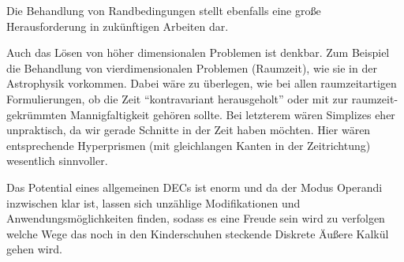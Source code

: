 Die Behandlung von Randbedingungen stellt ebenfalls eine große Herausforderung in zukünftigen Arbeiten dar.

Auch das Lösen von höher dimensionalen Problemen ist denkbar.
Zum Beispiel die Behandlung von vierdimensionalen Problemen (Raumzeit), wie sie in der Astrophysik vorkommen.
Dabei wäre zu überlegen, wie bei allen raumzeitartigen Formulierungen, ob die Zeit "`kontravariant herausgeholt"' 
oder mit zur raumzeit-gekrümmten Mannigfaltigkeit gehören sollte. 
Bei letzterem wären Simplizes eher unpraktisch, da wir gerade Schnitte in der Zeit haben möchten. 
Hier wären entsprechende Hyperprismen (mit gleichlangen Kanten in der Zeitrichtung) wesentlich sinnvoller.

Das Potential eines allgemeinen DECs ist enorm und da der Modus Operandi inzwischen klar ist, lassen sich unzählige Modifikationen und
Anwendungsmöglichkeiten finden, sodass es eine Freude sein wird zu verfolgen welche Wege das noch in den Kinderschuhen steckende Diskrete
Äußere Kalkül gehen wird.
